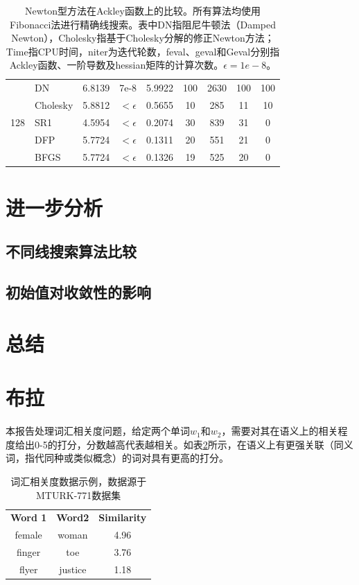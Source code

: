 \documentclass{article}
\begin{document}
\begin{table}[h]
\begin{tabular}{c l c c c c c c c}
    \cmidrule(lr){1-9}
    \multirow{5}{*}{128} &
    DN & 6.8139 & 7e-8 & 5.9922 & 100 & 2630 & 100 & 100 \\
    & Cholesky & 5.8812 & $<\epsilon$ & 0.5655 & 10 & 285 & 11 & 10 \\
    & SR1 & 4.5954 & $<\epsilon$ & 0.2074 & 30 & 839 & 31 & 0 \\
    & DFP & 5.7724 & $<\epsilon$ & 0.1311 & 20 & 551 & 21 & 0 \\
    & BFGS & 5.7724 & $<\epsilon$ & 0.1326 & 19 & 525 & 20 & 0 \\
    \bottomrule
  \end{tabular}
  \caption{Newton型方法在Ackley函数上的比较。所有算法均使用Fibonacci法进行精确线搜索。表中DN指阻尼牛顿法（Damped Newton），Cholesky指基于Cholesky分解的修正Newton方法；Time指CPU时间，niter为迭代轮数，feval、geval和Geval分别指Ackley函数、一阶导数及hessian矩阵的计算次数。$\epsilon=1e-8$。}
  \label{tab:overall}
\end{table}


\section{进一步分析}
\subsection{不同线搜索算法比较}

\subsection{初始值对收敛性的影响}

\section{总结}

\section{布拉}

本报告处理词汇相关度问题，给定两个单词$w_1$和$w_2$，需要对其在语义上的相关程度给出0-5的打分，分数越高代表越相关。如表\ref{tab:dataset_eg}所示，在语义上有更强关联（同义词，指代同种或类似概念）的词对具有更高的打分。

\begin{table}[h]
  \centering
  \begin{tabular}{c c c}
    \toprule
    \bfseries Word 1 & \bfseries Word2 & \bfseries Similarity \\
    \cmidrule(lr){1-3}
    female & woman & 4.96 \\
    finger & toe & 3.76 \\
    flyer & justice & 1.18\\
    \bottomrule
  \end{tabular}
  \caption{词汇相关度数据示例，数据源于MTURK-771数据集}
  \label{tab:dataset_eg}
\end{table}
\end{document}

